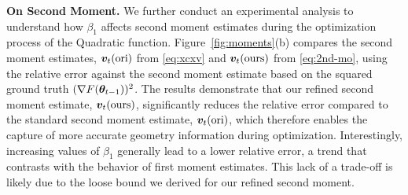 \textbf{On Second Moment.} We further conduct an experimental analysis to understand how $\beta_1$ affects second moment estimates during the optimization process of the Quadratic function. Figure~\ref{fig:moments}(b) compares the second moment estimates, ${\bm{v}}_t(\text{ori})$ from \eqref{eq:xcxv} and ${\bm{v}}_t(\text{ours})$ from \eqref{eq:2nd-mo}, using the relative error against the second moment estimate based on the squared ground truth $(\nabla F({\bm{\theta}}_{t-1}))^2$. The results demonstrate that our refined second moment estimate, ${\bm{v}}_t(\text{ours})$, significantly reduces the relative error compared to the standard second moment estimate, ${\bm{v}}_t(\text{ori})$, which therefore enables the capture of more accurate geometry information during optimization. Interestingly, increasing values of $\beta_1$ generally lead to a lower relative error, a trend that contrasts with the behavior of first moment estimates. This lack of a trade-off is likely due to the loose bound we derived for our refined second moment.


